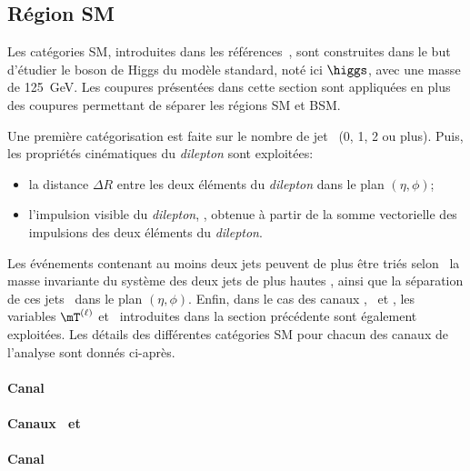\subsection{Région \og SM \fg{}}\label{chapter-HTT_analysis-section-categorisation-SM}
Les catégories SM, introduites dans les références~\cite{Artur_thesis,sm_categories}, sont construites dans le but d'étudier le boson de Higgs du modèle standard, noté ici $\higgs$, avec une masse de \SI{125}{\GeV}.
Les coupures présentées dans cette section sont appliquées en plus des coupures permettant de séparer les régions SM et BSM.
\par
Une première catégorisation est faite sur le nombre de jet \Njets\ (0, 1, 2 ou plus).
Puis, les propriétés cinématiques du \emph{dilepton} sont exploitées:
\begin{itemize}
\item la distance $\Delta R$ entre les deux éléments du \emph{dilepton} dans le plan $(\eta,\phi)$;
\item l'impulsion visible du \emph{dilepton}, \pTvis, obtenue à partir de la somme vectorielle des impulsions des deux éléments du \emph{dilepton}.
\end{itemize}
Les événements contenant au moins deux jets peuvent de plus être triés selon \mjj\ la masse invariante du système des deux jets de plus hautes \pT, ainsi que la séparation de ces jets \Detajj\ dans le plan $(\eta,\phi)$.
Enfin, dans le cas des canaux \mu\tauh, \ele\tauh\ et \ele\mu, les variables $\mT^{(\ell)}$ et \Dzeta\ introduites dans la section précédente sont également exploitées.
Les détails des différentes catégories SM pour chacun des canaux de l'analyse sont donnés ci-après.
\paragraph{Canal \tauh\tauh}

\paragraph{Canaux \mu\tauh\ et \ele\tauh}

\paragraph{Canal \ele\mu}


	
